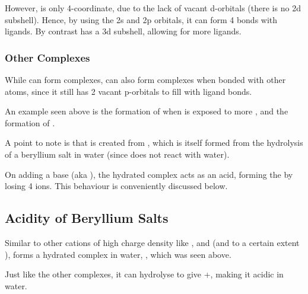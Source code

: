				However,  is only 4-coordinate, due to the lack of vacant d-orbitals (there is no 2d
				subshell). Hence, by using the 2s and 2p orbitals, it can form 4 bonds with ligands. By contrast
				 has a 3d subshell, allowing for more ligands.



			\pagebreak
			\subsubsection{Other Complexes}

				While  can form complexes,  can also form complexes when bonded with other
				atoms, since it still has 2 vacant p-orbitals to fill with ligand bonds.

				An example seen above is the formation of  when  is exposed to
				more , and the formation of .


				A point to note is that  is created from , which is itself formed
				from the hydrolysis of a beryllium salt in water (since  does not react with water).

				On adding a base (aka ), the hydrated  complex acts as an acid,
				forming the  by losing 4  ions. This behaviour is conveniently
				discussed below.



		\subsection{Acidity of Beryllium Salts}

			Similar to other cations of high charge density like ,  and  (and to
			a certain extent ),  forms a hydrated complex in water, ,
			which was seen above.

			Just like the other complexes, it can hydrolyse to give +, making it acidic in water.

